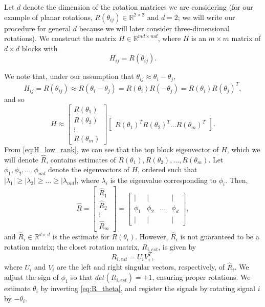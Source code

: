 \documentclass{pnastwo}
\begin{document}
\begin{article}
\begin{materials}
Let $d$ denote the dimension of the rotation matrices we are considering (for our example of planar rotations, $R(\theta_{ij}) \in \mathbb{R}^{2 \times 2}$ and $d=2$; we will write our procedure for general $d$ because we will later consider three-dimensional rotations).
%
We construct the matrix $H \in \mathbb{R}^{md \times md}$, where $H$ is an $m \times m$ matrix of $d \times d$ blocks with
\begin{equation} \label{eq:H_to_R}
H_{ij} = R(\theta_{ij}).
\end{equation}
%

We note that, under our assumption that $\theta_{ij} \approx \theta_i - \theta_j$, 
\begin{equation} 
H_{ij} = R(\theta_{ij}) \approx R(\theta_i - \theta_j) = R(\theta_i) R(-\theta_j) = R(\theta_i) R(\theta_j)^T,
\end{equation}
 and so
\begin{equation} \label{eq:H_low_rank}
	H \approx 
	\begin{bmatrix}
	R(\theta_1) \\
	R(\theta_2) \\
	\vdots \\
	R(\theta_m)
	\end{bmatrix}
	\begin{bmatrix}
	R(\theta_1)^T R(\theta_2)^T \dots R(\theta_m)^T
	\end{bmatrix}.
\end{equation}
%
From \eqref{eq:H_low_rank}, we can see that the top block eigenvector of $H$, which we will denote $\hat{R}$, contains estimates of $R(\theta_1), R(\theta_2), \dots, R(\theta_m)$.
%
Let $\phi_1, \phi_2, \dots, \phi_{md}$ denote the eigenvectors of $H$, ordered such that $|\lambda_1| \ge |\lambda_2| \ge \dots \ge |\lambda_{md}|$, where $\lambda_i$ is the eigenvalue corresponding to $\phi_i$. 
%
Then,
\begin{equation}
\hat{R} = 
\begin{bmatrix}
\hat{R}_1 \\
\hat{R}_2 \\
\vdots \\
\hat{R}_m
\end{bmatrix} =
\begin{bmatrix}
| & | & & | \\
\phi_1 & \phi_2 & \dots & \phi_d \\
| & | & & | 
\end{bmatrix},
\end{equation}
and $\hat{R}_i \in \mathbb{R}^{d \times d}$ is the estimate for $R(\theta_i)$. 
%
However, $\hat{R}_i$ is not guaranteed to be a rotation matrix; the closet rotation matrix, $R_{i, est}$, is given by
\begin{equation} \label{eq:R_est}
R_{i, est} = U_i V_i^T, 
\end{equation} 
where $U_i$ and $V_i$ are the left and right singular vectors, respectively, of $\hat{R}_i$.
%
We adjust the sign of $\phi_1$ so that $det(R_{i, est}) = +1$, ensuring proper rotations.
%
We estimate $\theta_{i}$ by inverting \eqref{eq:R_theta}, and register the signals by rotating signal $i$ by $-\theta_i$. 


\end{materials}
\end{article}
\end{document}
